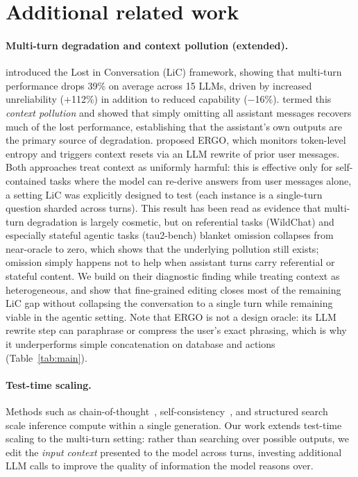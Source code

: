 \documentclass{article}
\begin{document}
\section{Additional related work}
\label{app:additional-related}

\paragraph{Multi-turn degradation and context pollution (extended).}
\citet{laban2025lost} introduced the Lost in Conversation (LiC) framework, showing that multi-turn performance drops 39\% on average across 15 LLMs, driven by increased unreliability (+112\%) in addition to reduced capability ($-$16\%). \citet{huang2026context} termed this \emph{context pollution} and showed that simply omitting all assistant messages recovers much of the lost performance, establishing that the assistant's own outputs are the primary source of degradation. \citet{khalid2025ergo} proposed ERGO, which monitors token-level entropy and triggers context resets via an LLM rewrite of prior user messages. Both approaches treat context as uniformly harmful: this is effective only for self-contained tasks where the model can re-derive answers from user messages alone, a setting LiC was explicitly designed to test (each instance is a single-turn question sharded across turns). This result has been read as evidence that multi-turn degradation is largely cosmetic, but on referential tasks (WildChat) and especially stateful agentic tasks (tau2-bench) blanket omission collapses from near-oracle to zero, which shows that the underlying pollution still exists; omission simply happens not to help when assistant turns carry referential or stateful content. We build on their diagnostic finding while treating context as heterogeneous, and show that fine-grained editing closes most of the remaining LiC gap without collapsing the conversation to a single turn while remaining viable in the agentic setting. Note that ERGO is not a design oracle: its LLM rewrite step can paraphrase or compress the user's exact phrasing, which is why it underperforms simple concatenation on database and actions (Table~\ref{tab:main}).

\paragraph{Test-time scaling.}
Methods such as chain-of-thought~\citep{wei2022chain}, self-consistency~\citep{wang2023selfconsistency}, and structured search~\citep{yao2024tree} scale inference compute within a single generation. Our work extends test-time scaling to the multi-turn setting: rather than searching over possible outputs, we edit the \emph{input context} presented to the model across turns, investing additional LLM calls to improve the quality of information the model reasons over.
\end{document}
